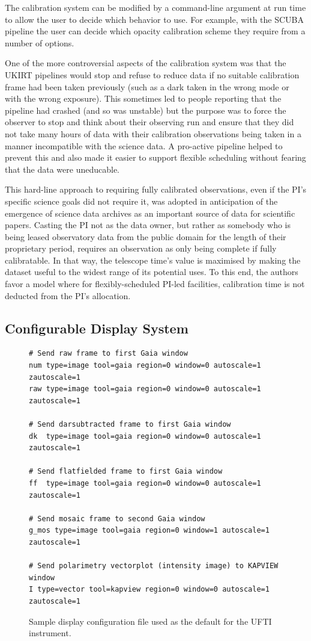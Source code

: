 \documentclass[final,authoryear,5p,times,twocolumn]{elsarticle}
\begin{document}
The calibration system can be modified by a command-line argument at
run time to allow the user to decide which behavior to use. For
example, with the SCUBA pipeline \citep{1999ASPC..172..171J} the user
can decide which opacity calibration scheme they require from a number
of options.

One of the more controversial aspects of the calibration system was
that the UKIRT pipelines would stop and refuse to reduce data if no
suitable calibration frame had been taken previously (such as a dark
taken in the wrong mode or with the wrong exposure). This sometimes
led to people reporting that the pipeline had crashed (and so was
unstable) but the purpose was to force the observer to stop and think
about their observing run and ensure that they did not take many hours
of data with their calibration observations being taken in a manner
incompatible with the science data. A pro-active pipeline helped to
prevent this and also made it easier to support flexible scheduling
\citep{2002ASPC..281..488E,2004SPIE.5493...24A} without fearing that
the data were uneducable.

This hard-line approach to requiring fully calibrated observations,
even if the PI's specific science goals did not require it, was
adopted in anticipation of the emergence of science data archives as
an important source of data for scientific papers. Casting the PI not
as the data owner, but rather as somebody who is being leased
observatory data from the public domain for the length of their
proprietary period, requires an observation as only being complete if
fully calibratable. In that way, the telescope time's value is
maximised by making the dataset useful to the widest range of its
potential uses. To this end, the authors favor a model where for
flexibly-scheduled PI-led facilities, calibration time is not deducted
from the PI's allocation.

\subsection{Configurable Display System}

\begin{figure}
{\small
\begin{verbatim}
# Send raw frame to first Gaia window
num type=image tool=gaia region=0 window=0 autoscale=1 zautoscale=1
raw type=image tool=gaia region=0 window=0 autoscale=1 zautoscale=1

# Send darsubtracted frame to first Gaia window
dk  type=image tool=gaia region=0 window=0 autoscale=1 zautoscale=1

# Send flatfielded frame to first Gaia window
ff  type=image tool=gaia region=0 window=0 autoscale=1 zautoscale=1

# Send mosaic frame to second Gaia window
g_mos type=image tool=gaia region=0 window=1 autoscale=1 zautoscale=1

# Send polarimetry vectorplot (intensity image) to KAPVIEW window
I type=vector tool=kapview region=0 window=0 autoscale=1 zautoscale=1
\end{verbatim}
}
\caption{Sample display configuration file used as the default for the
  UFTI instrument.}
\label{fig:disp}
\end{figure}
\end{document}
